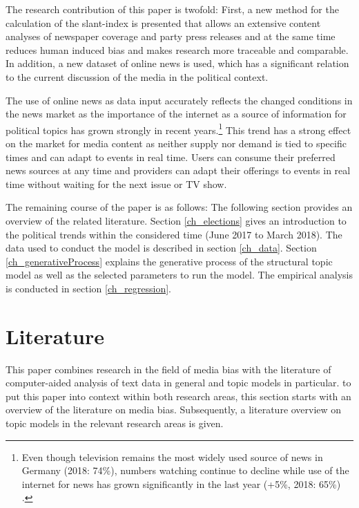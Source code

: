 \documentclass[12pt,a4paper,notitlepage]{article}
\begin{document}
The research contribution of this paper is twofold: First, a new method for the calculation of the slant-index is presented that allows an extensive content analyses of newspaper coverage and party press releases and at the same time reduces human induced bias and makes research more traceable and comparable. In addition, a new dataset of online news is used, which has a significant relation to the current discussion of the media in the political context. 

The use of online news as data input accurately reflects the changed conditions in the news market as the importance of the internet as a source of information for political topics has grown strongly in recent years.\footnote{Even though television remains the most widely used source of news in Germany (2018: 74\%), numbers watching continue to decline while use of the internet for news has grown significantly in the last year (+5\%, 2018: 65\%) \citep{holig_reuters_2018}.} This trend has a strong effect on the market for media content as neither supply nor demand is tied to specific times and can adapt to events in real time. Users can consume their preferred news sources at any time and providers can adapt their offerings to events in real time without waiting for the next issue or TV show.

The remaining course of the paper is as follows: The following section provides an overview of the related literature. Section \ref{ch_elections} gives an introduction to the political trends within the considered time (June 2017 to March 2018). The data used to conduct the model is described in section \ref{ch_data}. Section \ref{ch_generativeProcess} explains the generative process of the structural topic model as well as the selected parameters to run the model. The empirical analysis is conducted in section \ref{ch_regression}. 


\section{Literature}

This paper combines research in the field of media bias with the literature of computer-aided analysis of text data in general and topic models in particular. to put this paper into context within both research areas, this section starts with an overview of the literature on media bias. Subsequently, a literature overview on topic models in the relevant research areas is given. 
\end{document}
